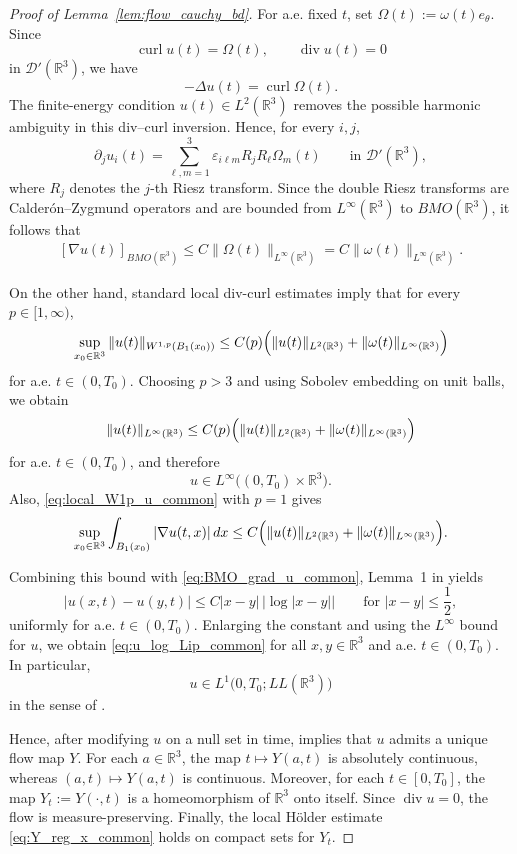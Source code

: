 \documentclass[reqno,11pt]{amsart}
\begin{document}
\begin{proof}[Proof of Lemma~\ref{lem:flow_cauchy_bd}]
For a.e. fixed \(t\), set \(\Omega(t):=\omega(t)e_\theta\). Since
\[
\operatorname{curl}u(t)=\Omega(t),
\qquad
\operatorname{div}u(t)=0
\]
in \(\mathcal D'(\mathbb R^3)\), we have
\[
-\Delta u(t)=\operatorname{curl}\Omega(t).
\]
The finite-energy condition \(u(t)\in L^2(\mathbb R^3)\) removes the possible
harmonic ambiguity in this div--curl inversion. Hence, for every \(i,j\),
\[
\partial_j u_i(t)
=
\sum_{\ell,m=1}^3
\varepsilon_{i\ell m} R_jR_\ell \Omega_m(t)
\qquad\text{in }\mathcal D'(\mathbb R^3),
\]
where \(R_j\) denotes the \(j\)-th Riesz transform. Since the double Riesz
transforms are Calder\'on--Zygmund operators and are bounded from
\(L^\infty(\mathbb R^3)\) to \(BMO(\mathbb R^3)\), it follows that
\begin{align}
\label{eq:BMO_grad_u_common}
[\nabla u(t)]_{BMO(\mathbb R^3)}
\le C\|\Omega(t)\|_{L^\infty(\mathbb R^3)}
=
C\|\omega(t)\|_{L^\infty(\mathbb R^3)}.
\end{align}

On the other hand, standard local div-curl estimates imply that for every
$p\in[1,\infty)$,
\begin{equation}
\label{eq:local_W1p_u_common}
\sup_{x_0\in\mathbb R^3}
\|u(t)\|_{W^{1,p}(B_1(x_0))}
\le
C(p)\Bigl(
\|u(t)\|_{L^2(\mathbb R^3)}
+\|\omega(t)\|_{L^\infty(\mathbb R^3)}
\Bigr)
\end{equation}
for a.e. $t\in(0,T_0)$. Choosing $p>3$ and using Sobolev embedding on unit balls, we obtain
\[
\|u(t)\|_{L^\infty(\mathbb R^3)}
\le
C(p)\Bigl(
\|u(t)\|_{L^2(\mathbb R^3)}
+\|\omega(t)\|_{L^\infty(\mathbb R^3)}
\Bigr)
\]
for a.e. $t\in(0,T_0)$, and therefore
\[
u\in L^\infty\bigl((0,T_0)\times\mathbb R^3\bigr).
\]
Also, \eqref{eq:local_W1p_u_common} with $p=1$ gives
\[
\sup_{x_0\in\mathbb R^3}\int_{B_1(x_0)}|\nabla u(t,x)|\,dx
\le
C\Bigl(
\|u(t)\|_{L^2(\mathbb R^3)}
+\|\omega(t)\|_{L^\infty(\mathbb R^3)}
\Bigr).
\]

Combining this bound with \eqref{eq:BMO_grad_u_common}, Lemma~1 in
\cite{AzzamBedrossian15} yields
\[
|u(x,t)-u(y,t)|
\le
C |x-y|\,|\log |x-y||
\qquad
\text{for }|x-y|\le \frac12,
\]
uniformly for a.e. $t\in(0,T_0)$. Enlarging the constant and using the
$L^\infty$ bound for $u$, we obtain \eqref{eq:u_log_Lip_common} for all
$x,y\in\mathbb R^3$ and a.e. $t\in(0,T_0)$. In particular,
\[
u\in L^1\bigl(0,T_0;LL(\mathbb R^3)\bigr)
\]
in the sense of \cite[Définition~5.2.1]{Chemin95}.

Hence, after modifying $u$ on a null set in time, \cite[Th\'eor\`eme~5.2.1]{Chemin95}
implies that $u$ admits a unique flow map $Y$.
For each $a\in\mathbb R^3$, the map $t\mapsto Y(a,t)$ is absolutely continuous,
whereas $(a,t)\mapsto Y(a,t)$ is continuous. Moreover, for each
$t\in[0,T_0]$, the map $Y_t:=Y(\cdot,t)$ is a homeomorphism of $\mathbb R^3$
onto itself. Since $\operatorname{div}u=0$, the flow is measure-preserving.
Finally,  the local H\"older estimate
\eqref{eq:Y_reg_x_common} holds on compact sets for $Y_t$. 


\end{proof}
\end{document}
